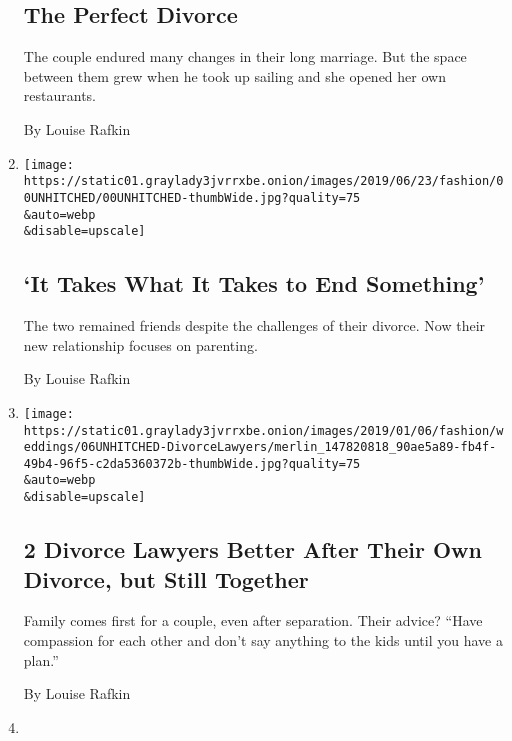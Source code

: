 \begin{enumerate}
  \hypertarget{the-perfect-divorce}{%
  \subsection{The Perfect Divorce}\label{the-perfect-divorce}}

  The couple endured many changes in their long marriage. But the space
  between them grew when he took up sailing and she opened her own
  restaurants.

  By Louise Rafkin
\item
  \href{/2019/06/18/style/it-takes-what-it-takes-to-end-something.html}{}

  \texttt{[image: https://static01.graylady3jvrrxbe.onion/images/2019/06/23/fashion/00UNHITCHED/00UNHITCHED-thumbWide.jpg?quality=75\\\&auto=webp\\\&disable=upscale]}

  \hypertarget{it-takes-what-it-takes-to-end-something}{%
  \subsection{`It Takes What It Takes to End
  Something'}\label{it-takes-what-it-takes-to-end-something}}

  The two remained friends despite the challenges of their divorce. Now
  their new relationship focuses on parenting.

  By Louise Rafkin
\item
  \href{/2019/01/03/fashion/weddings/2-divorce-lawyers-better-after-their-own-divorce-but-still-together.html}{}

  \texttt{[image: https://static01.graylady3jvrrxbe.onion/images/2019/01/06/fashion/weddings/06UNHITCHED-DivorceLawyers/merlin\_147820818\_90ae5a89-fb4f-49b4-96f5-c2da5360372b-thumbWide.jpg?quality=75\\\&auto=webp\\\&disable=upscale]}

  \hypertarget{2-divorce-lawyers-better-after-their-own-divorce-but-still-together}{%
  \subsection{2 Divorce Lawyers Better After Their Own Divorce, but
  Still
  Together}\label{2-divorce-lawyers-better-after-their-own-divorce-but-still-together}}

  Family comes first for a couple, even after separation. Their advice?
  ``Have compassion for each other and don't say anything to the kids
  until you have a plan.''

  By Louise Rafkin
\item
  \href{/2018/12/04/fashion/weddings/redux-older-wiser-and-still-very-much-in-love.html}{}


\end{enumerate}
